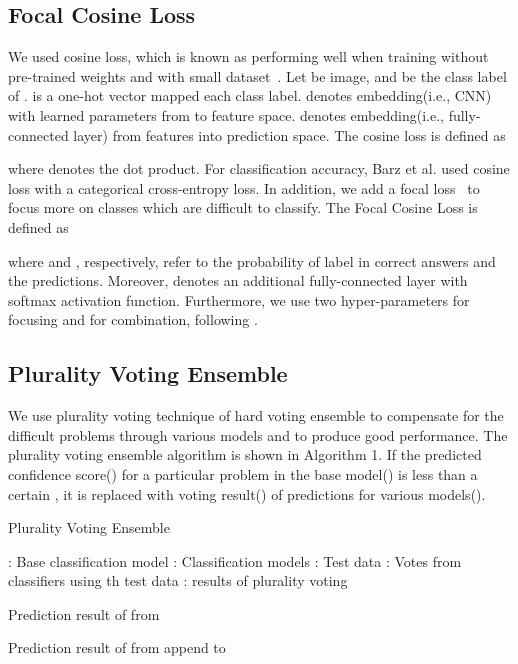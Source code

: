 \documentclass[runningheads]{llncs}
\begin{document}
\subsection{Focal Cosine Loss}
We used cosine loss, which is known as performing well when training without pre-trained weights and with small dataset~\cite{barz2020deep}. Let  be image, and  be the class label of .  is a one-hot vector mapped each class label.  denotes embedding(i.e., CNN) with learned parameters  from  to feature space.  denotes embedding(i.e., fully-connected layer) from features into prediction space. The cosine loss is defined as



where  denotes the dot product. For classification accuracy, Barz et al. \cite{barz2020deep} used cosine loss with a categorical cross-entropy loss. In addition, we add a focal loss~\cite{lin2017focal} to focus more on classes which are difficult to classify. The Focal Cosine Loss is defined as







where  and , respectively, refer to the probability of label  in correct answers and the predictions. Moreover,  denotes an additional fully-connected layer with softmax activation function. Furthermore, we use two hyper-parameters  for focusing and  for combination, following \cite{barz2020deep,lin2017focal}.

\subsection{Plurality Voting Ensemble}
We use plurality voting technique of hard voting ensemble to compensate for the difficult problems through various models and to produce good performance. The plurality voting ensemble algorithm is shown in Algorithm 1. If the predicted confidence score() for a particular problem in the base model() is less than a certain , it is replaced with voting result() of predictions for various models(). 

\newcommand{\factorial}{\ensuremath{\mbox{\sc Factorial}}}
\begin{algorithm}
\caption{Plurality Voting Ensemble}\label{plurality}
\begin{algorithmic}[1]

\State : Base classification model
\State :  Classification models
\State :  Test data
\State : Votes from  classifiers using  th test data
\State : results of plurality voting

    \State  Prediction result of  from 
    
        \State  Prediction result of  from 
        \State append  to 
        \EndFor
        \State 
    
    \Else
        \State 
        
    \EndIf
\EndFor

\State \Return 

\EndProcedure
\end{algorithmic}
\end{algorithm}
\end{document}
